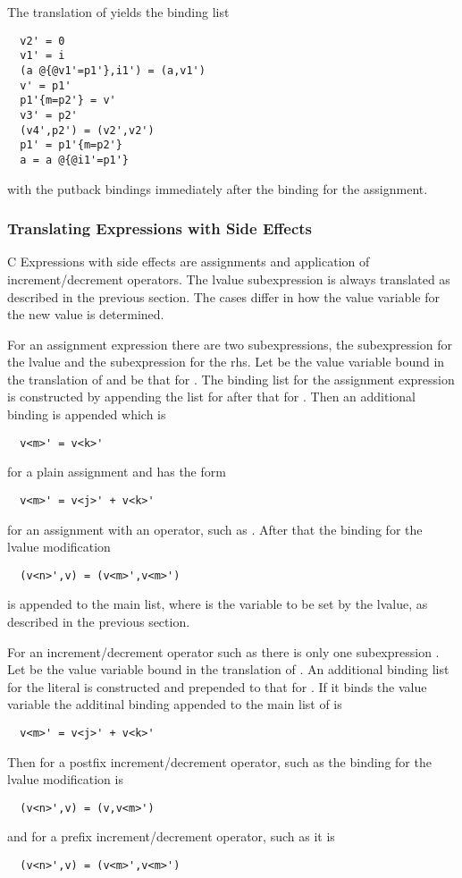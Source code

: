 The translation of  yields the binding list
\begin{verbatim}
  v2' = 0
  v1' = i
  (a @{@v1'=p1'},i1') = (a,v1')
  v' = p1'
  p1'{m=p2'} = v'
  v3' = p2'
  (v4',p2') = (v2',v2')
  p1' = p1'{m=p2'}
  a = a @{@i1'=p1'}
\end{verbatim}
with the putback bindings immediately after the binding for the assignment.

\subsubsection{Translating Expressions with Side Effects}

C Expressions with side effects are assignments and application of increment/decrement operators. The lvalue subexpression is always 
translated as described in the previous section. The cases differ in how the value variable  for the new value is 
determined.

For an assignment expression there are two subexpressions, the subexpression  for the lvalue and the subexpression 
for the rhs. Let  be the value variable bound in the translation of  and  be that for .
The binding list for the assignment expression is constructed by appending the list for  after that for .
Then an additional binding is appended which is
\begin{verbatim}
  v<m>' = v<k>'
\end{verbatim}
for a plain assignment  and has the form
\begin{verbatim}
  v<m>' = v<j>' + v<k>'
\end{verbatim}
for an assignment with an operator, such as . After that the binding for the lvalue modification
\begin{verbatim}
  (v<n>',v) = (v<m>',v<m>')
\end{verbatim}
is appended to the main list, where  is the variable to be set by the lvalue, as described in the previous section.

For an increment/decrement operator such as  there is only one subexpression . Let  be the value
variable bound in the translation of . An additional binding list for the literal  is constructed and
prepended to that for . If it binds the value variable  the additinal binding appended to the main
list of  is
\begin{verbatim}
  v<m>' = v<j>' + v<k>'
\end{verbatim}
Then for a postfix increment/decrement operator, such as  the binding for the lvalue modification is
\begin{verbatim}
  (v<n>',v) = (v,v<m>')
\end{verbatim}
and for a prefix increment/decrement operator, such as  it is
\begin{verbatim}
  (v<n>',v) = (v<m>',v<m>')
\end{verbatim}

